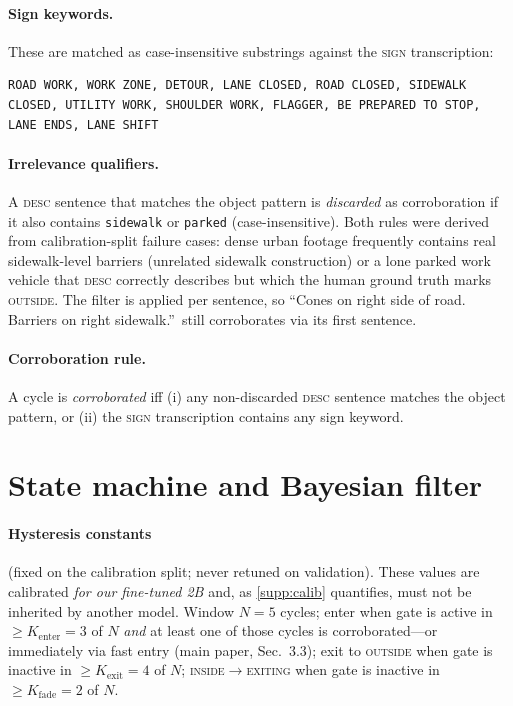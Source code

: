 \documentclass[10pt,twocolumn,letterpaper]{article}
\begin{document}
\paragraph{Sign keywords.}  These are matched as case-insensitive substrings against the \textsc{sign} transcription:
\begin{lstlisting}
ROAD WORK, WORK ZONE, DETOUR, LANE CLOSED, ROAD CLOSED, SIDEWALK CLOSED, UTILITY WORK, SHOULDER WORK, FLAGGER, BE PREPARED TO STOP, LANE ENDS, LANE SHIFT
\end{lstlisting}

\paragraph{Irrelevance qualifiers.}  A \textsc{desc} sentence that matches the object pattern is \emph{discarded} as corroboration if it also contains \texttt{sidewalk} or \texttt{parked} (case-insensitive).  Both rules were derived from calibration-split failure cases: dense urban footage frequently contains real sidewalk-level barriers (unrelated sidewalk construction) or a lone parked work vehicle that \textsc{desc} correctly describes but which the human ground truth marks \textsc{outside}.  The filter is applied per sentence, so ``Cones on right side of road. Barriers on right sidewalk.''\ still corroborates via its first sentence.

\paragraph{Corroboration rule.}  A cycle is \emph{corroborated} iff (i) any non-discarded \textsc{desc} sentence matches the object pattern, or (ii) the \textsc{sign} transcription contains any sign keyword.

\section{State machine and Bayesian filter}
\label{supp:bayes}

\paragraph{Hysteresis constants} (fixed on the calibration split; never retuned on validation).  These values are calibrated \emph{for our fine-tuned 2B} and, as \cref{supp:calib} quantifies, must not be inherited by another model.  Window $N{=}5$ cycles; enter when gate is active in $\geq K_\text{enter}{=}3$ of $N$ \emph{and} at least one of those cycles is corroborated---or immediately via fast entry (main paper, Sec.~3.3); exit to \textsc{outside} when gate is inactive in $\geq K_\text{exit}{=}4$ of $N$; \textsc{inside}$\to$\textsc{exiting} when gate is inactive in $\geq K_\text{fade}{=}2$ of $N$.
\end{document}
